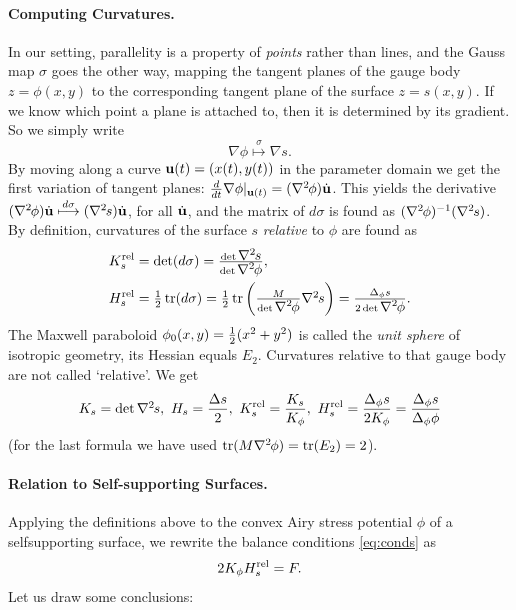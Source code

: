 \documentclass[annual]{acmsiggraph}
\def\tr{\mathop{\textrm{tr}}\nolimits}
\def\rel{{\mathord{\text{\rm rel}}}}
\def\ess{s}
\def\Hess#1{{\def\testess{#1}\nabla^2\ifx\testess\ess\!s\else #1\fi}}
\def\Hess#1{\mathord{\mbox{${\nabla^2\hskip-.2ex #1}$}}}
\begin{document}
\paragraph{Computing Curvatures.}

In our setting, parallelity is a property of {\em points} rather than 
lines, and the Gauss map $\sigma$ goes the other way, mapping the tangent 
planes of the gauge body $z=\phi(x,y)$ to the corresponding tangent plane 
of the surface $z=s(x,y)$. If we know which point a plane is attached to, 
then it is determined by its gradient. So we simply write
	$$\nabla \phi\overset\sigma\longmapsto\nabla s.$$
 By moving along a curve ${\mathbf u}(t)=(x(t),y(t))$ in the parameter domain we 
get the first variation of tangent planes:
	$
	{d\over dt}\nabla \phi|_{\uw(t)} = 
	(\Hess\phi)\dot\uw
	$.
 This yields the derivative
	$	
	(\Hess\phi)\dot\uw \overset{d\sigma}\longmapsto
	(\Hess s)\dot\uw $,
 for all $\dot{{\mathbf u}}$, and the matrix of $d\sigma$ is found as 
$(\Hess\phi)^{-1}(\Hess s)$.  By definition, curvatures of the surface $s$ 
{\em relative} to $\phi$ are found as
	\begin{align*}
		K_s^\rel 
	& = \textstyle
		\det(d\sigma) =
		{\det\Hess s \over \det\Hess\phi} ,
	\\
		H_s^\rel
	&= \textstyle
		{1\over 2}\tr(d\sigma) 
		= {1\over 2}\tr \left({M\over\det\Hess\phi} \Hess s\right)
		=  {\Delta_\phi s \over 2\det\Hess\phi}.
	\end{align*}
 The Maxwell paraboloid $\phi_0(x,y)={1\over 2}(x^2+y^2)$ is called the 
{\em unit sphere} of isotropic geometry, its Hessian equals $E_2$. 
Curvatures relative to that gauge body are not called `relative'. We get
	\begin{align*}
	K_s = \det \Hess s, 
		\ 
	H_s = {\Delta s \over 2},
		\
	K_s^\rel = {K_s\over K_\phi},
		\
	H_s^\rel =  {\Delta_\phi s \over 2 K_\phi}
			= {\Delta_\phi s\over \Delta_\phi \phi}
	\end{align*}
 (for the last formula we have used $\tr (M\Hess\phi)=\tr(E_2)=2$).

\paragraph{Relation to Self-supporting Surfaces.}

Applying the definitions above to the convex Airy stress potential $\phi$ 
of a self\dash supporting surface, we rewrite the balance conditions 
\eqref{eq:conds} as
	\begin{equation}
	2 K_\phi H_s^\rel  = F.
	\label{equigeo}
	\end{equation}
 Let us draw some conclusions:
\end{document}
